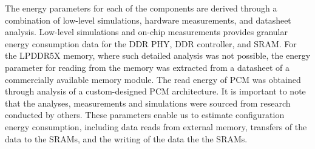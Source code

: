 
The energy parameters for each of the components are derived through a combination of low-level simulations, hardware measurements, and datasheet analysis.
Low-level simulations and on-chip measurements provides granular energy consumption data for the DDR PHY, DDR controller, \confignoc{} and SRAM.
For the LPDDR5X memory, where such detailed analysis was not possible, the energy parameter for reading from the memory was extracted from a datasheet of a commercially available memory module.
The read energy of PCM was obtained through analysis of a custom-designed PCM architecture.
It is important to note that the analyses, measurements and simulations were sourced from research conducted by others.
These parameters enable us to estimate configuration energy consumption, including data reads from external memory, transfers of the data to the SRAMs, and the writing of the data the the SRAMs.

